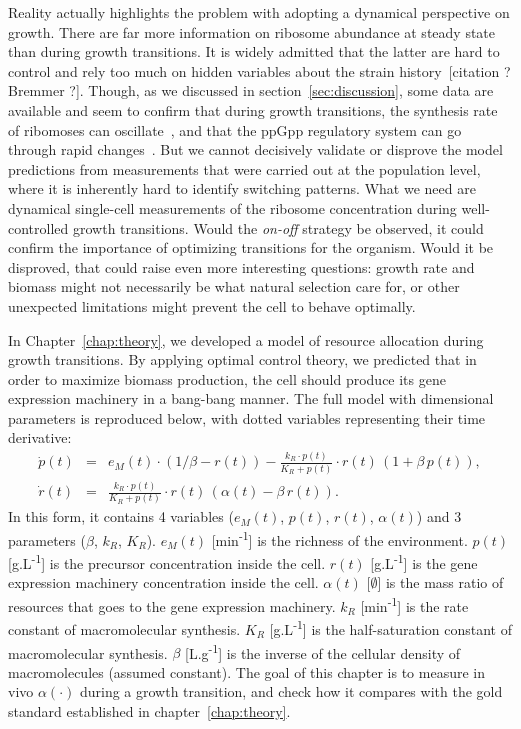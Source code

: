 Reality actually highlights the problem with adopting a dynamical perspective on growth.
There are far more information on ribosome abundance at steady state than during growth transitions.
It is widely admitted that the latter are hard to control and rely too much on hidden variables about the strain history~[citation ? Bremmer ?].
Though, as we discussed in section~\ref{sec:discussion}, some data are available and seem to confirm that during growth transitions, the  synthesis rate of ribomoses can oscillate~\cite{gausing_regulation_1980,zengel_transcription_1986}, and that the ppGpp regulatory system can go through rapid changes~\cite{friesen_synthesis_1975,murray_control_2003}.
But we cannot decisively validate or disprove the model predictions from measurements that were carried out at the population level, where it is inherently hard to identify switching patterns.
What we need are dynamical single-cell measurements of the ribosome concentration during well-controlled growth transitions.
Would the \textit{on-off} strategy be observed, it could confirm the importance of optimizing transitions for the organism.
Would it be disproved, that could raise even more interesting questions: growth rate and biomass might not necessarily be what natural selection care for, or other unexpected limitations might prevent the cell to behave optimally.

In Chapter~\ref{chap:theory}, we developed a model of resource allocation during growth transitions.
By applying optimal control theory, we predicted that in order to maximize biomass production, the cell should produce its gene expression machinery in a bang-bang manner.
The full model with dimensional parameters is reproduced below, with dotted variables representing their time derivative:
\begin{eqnarray}
\dot{p}(t) &=& e_M(t)\cdot (1/\beta - r(t)) - \frac{k_R \cdot p(t)}{K_R + p(t)}\cdot r(t) \, (1+\beta\, p(t)), \label{eq:pdef-exp}\\
\dot{r}(t) &=& \frac{k_R \cdot p(t)}{K_R + p(t)}\cdot r(t) \, (\alpha(t) - \beta\, r(t)). \label{eq:rdef-exp}
\end{eqnarray}
In this form, it contains 4 variables ($e_M(t)$, $p(t)$, $r(t)$, $\alpha (t)$) and 3 parameters ($\beta$, $k_R$, $K_R$).
$e_M(t)$ [min\textsuperscript{-1}] is the richness of the environment.
$p(t)$ [g.L\textsuperscript{-1}] is the precursor concentration inside the cell.
$r(t)$ [g.L\textsuperscript{-1}] is the gene expression machinery concentration inside the cell.
$\alpha (t)$ [$\emptyset$] is the mass ratio of resources that goes to the gene expression machinery.
$k_R$ [min\textsuperscript{-1}] is the rate constant of macromolecular synthesis.
$K_R$ [g.L\textsuperscript{-1}] is the half-saturation constant of macromolecular synthesis.
$\beta$ [L.g\textsuperscript{-1}] is the inverse of the cellular density of macromolecules (assumed constant).
The goal of this chapter is to measure in vivo $\alpha (\cdot)$ during a growth transition, and check how it compares with the gold standard established in chapter~\ref{chap:theory}.

